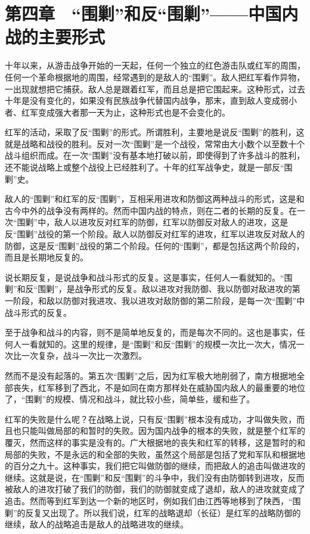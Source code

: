 \section{第四章　“围剿”和反“围剿”——中国内战的主要形式}

十年以来，从游击战争开始的一天起，任何一个独立的红色游击队或红军的周围，任何一个革命根据地的周围，经常遇到的是敌人的“围剿”。敌人把红军看作异物，一出现就想把它捕获。敌人总是跟着红军，而且总是把它围起来。这种形式，过去十年是没有变化的，如果没有民族战争代替国内战争，那末，直到敌人变成弱小者、红军变成强大者那一天为止，这种形式也是不会变化的。

红军的活动，采取了反“围剿”的形式。所谓胜利，主要地是说反“围剿”的胜利，这就是战略和战役的胜利。反对一次“围剿”是一个战役，常常由大小数个以至数十个战斗组织而成。在一次“围剿”没有基本地打破以前，即使得到了许多战斗的胜利，还不能说战略上或整个战役上已经胜利了。十年的红军战争史，就是一部反“围剿”史。

敌人的“围剿”和红军的反“围剿”，互相采用进攻和防御这两种战斗的形式，这是和古今中外的战争没有两样的。然而中国内战的特点，则在二者的长期的反复。在一次“围剿”中，敌人以进攻反对红军的防御，红军以防御反对敌人的进攻，这是反“围剿”战役的第一个阶段。敌人以防御反对红军的进攻，红军以进攻反对敌人的防御，这是反“围剿”战役的第二个阶段。任何的“围剿”，都是包括这两个阶段的，而且是长期地反复的。

说长期反复，是说战争和战斗形式的反复。这是事实，任何人一看就知的。“围剿”和反“围剿”，是战争形式的反复。敌以进攻对我防御、我以防御对敌进攻的第一阶段，和敌以防御对我进攻、我以进攻对敌防御的第二阶段，是每一次“围剿”中战斗形式的反复。

至于战争和战斗的内容，则不是简单地反复的，而是每次不同的。这也是事实，任何人一看就知的。这里的规律，是“围剿”和反“围剿”的规模一次比一次大，情况一次比一次复杂，战斗一次比一次激烈。

然而不是没有起落的。第五次“围剿”之后，因为红军极大地削弱了，南方根据地全部丧失，红军移到了西北，不是如同在南方那样处在威胁国内敌人的最重要的地位了，“围剿”的规模、情况和战斗，就比较小些，简单些，缓和些了。

红军的失败是什么呢？在战略上说，只有反“围剿”根本没有成功，才叫做失败，而且也只能叫做局部的和暂时的失败。因为国内战争的根本的失败，就是整个红军的覆灭，然而这样的事实是没有的。广大根据地的丧失和红军的转移，这是暂时的和局部的失败，不是永远的和全部的失败，虽然这个局部是包括了党和军队和根据地的百分之九十。这种事实，我们把它叫做防御的继续，而把敌人的追击叫做进攻的继续。这就是说，在“围剿”和反“围剿”的斗争中，我们没有由防御转到进攻，反而被敌人的进攻打破了我们的防御，我们的防御就变成了退却，敌人的进攻就变成了追击。然而等到红军到达一个新的地区时，例如我们由江西等地移到了陕西，“围剿”的反复又出现了。所以我们说，红军的战略退却（长征）是红军的战略防御的继续，敌人的战略追击是敌人的战略进攻的继续。

